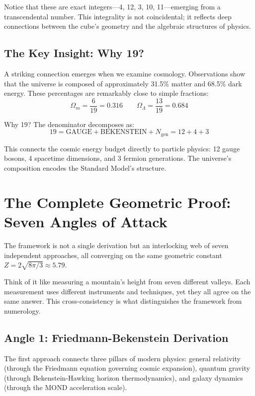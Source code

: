 \documentclass[11pt,a4paper]{article}
\theoremstyle{plain}
\theoremstyle{definition}
\theoremstyle{remark}
\newcommand{\Ngen}{N_{\text{gen}}}
\newcommand{\Omegam}{\Omega_m}
\newcommand{\OmegaL}{\Omega_\Lambda}
\newcommand{\GAUGE}{\text{GAUGE}}
\newcommand{\BEK}{\text{BEKENSTEIN}}
\begin{document}
Notice that these are exact integers---4, 12, 3, 10, 11---emerging from a transcendental number. This integrality is not coincidental; it reflects deep connections between the cube's geometry and the algebraic structures of physics.

\subsection{The Key Insight: Why 19?}

A striking connection emerges when we examine cosmology. Observations show that the universe is composed of approximately 31.5\% matter and 68.5\% dark energy. These percentages are remarkably close to simple fractions:
\[
\Omegam = \frac{6}{19} = 0.316 \qquad \OmegaL = \frac{13}{19} = 0.684
\]

Why 19? The denominator decomposes as:
\[
\boxed{19 = \GAUGE + \BEK + \Ngen = 12 + 4 + 3}
\]

This connects the cosmic energy budget directly to particle physics: 12 gauge bosons, 4 spacetime dimensions, and 3 fermion generations. The universe's composition encodes the Standard Model's structure.

\section{The Complete Geometric Proof: Seven Angles of Attack}

The framework is not a single derivation but an interlocking web of seven independent approaches, all converging on the same geometric constant $Z = 2\sqrt{8\pi/3} \approx 5.79$.

Think of it like measuring a mountain's height from seven different valleys. Each measurement uses different instruments and techniques, yet they all agree on the same answer. This cross-consistency is what distinguishes the framework from numerology.

\subsection{Angle 1: Friedmann-Bekenstein Derivation}

The first approach connects three pillars of modern physics: general relativity (through the Friedmann equation governing cosmic expansion), quantum gravity (through Bekenstein-Hawking horizon thermodynamics), and galaxy dynamics (through the MOND acceleration scale).
\end{document}
